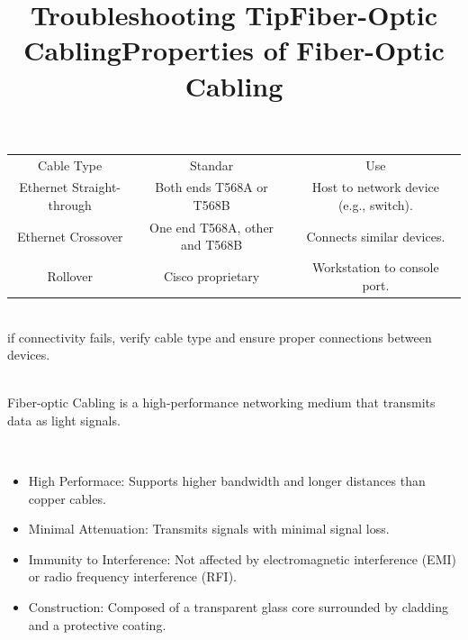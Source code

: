 \documentclass[a4paper,11pt]{article}
\begin{document}
\begin{center}
\begin{tabular}{ c c c }
 Cable Type & Standar & Use \\ 
 Ethernet Straight-through & Both ends T568A or T568B & Host to network device (e.g., switch). \\  
 Ethernet Crossover & One end T568A, other and T568B & Connects similar devices. \\
 Rollover & Cisco proprietary & Workstation to console port. \\
\end{tabular}
\end{center}

\title{Troubleshooting Tip}\\
if connectivity fails, verify cable type and ensure proper connections between devices.\\

\title{Fiber-Optic Cabling}\\
Fiber-optic Cabling is a high-performance networking medium that transmits data as light signals.\\

\title{Properties of Fiber-Optic Cabling}\\
\begin{itemize}
    \item High Performace: Supports higher bandwidth and longer distances than copper cables.\\
    \item Minimal Attenuation: Transmits signals with minimal signal loss.\\
    \item Immunity to Interference: Not affected by electromagnetic interference (EMI) or radio frequency interference (RFI).\\
    \item Construction: Composed of a transparent glass core surrounded by cladding and a protective coating.\\
\end{itemize}
\end{document}
